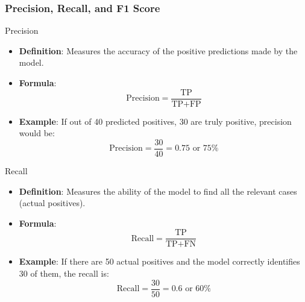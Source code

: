 \documentclass[aspectratio=169]{beamer}
\begin{document}
\begin{frame}[fragile]
    \frametitle{Precision, Recall, and F1 Score}
    \begin{block}{Precision}
        \begin{itemize}
            \item \textbf{Definition}: Measures the accuracy of the positive predictions made by the model.
            \item \textbf{Formula}:
            \begin{equation}
            \text{Precision} = \frac{\text{TP}}{\text{TP} + \text{FP}}
            \end{equation}
            \item \textbf{Example}: If out of 40 predicted positives, 30 are truly positive, precision would be:
            \begin{equation}
            \text{Precision} = \frac{30}{40} = 0.75 \text{ or } 75\%
            \end{equation}
        \end{itemize}
    \end{block}
    
    \begin{block}{Recall}
        \begin{itemize}
            \item \textbf{Definition}: Measures the ability of the model to find all the relevant cases (actual positives).
            \item \textbf{Formula}:
            \begin{equation}
            \text{Recall} = \frac{\text{TP}}{\text{TP} + \text{FN}}
            \end{equation}
            \item \textbf{Example}: If there are 50 actual positives and the model correctly identifies 30 of them, the recall is:
            \begin{equation}
            \text{Recall} = \frac{30}{50} = 0.6 \text{ or } 60\%
            \end{equation}
        \end{itemize}
    \end{block}


\end{frame}
\end{document}
